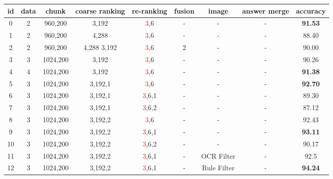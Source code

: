 \documentclass[11pt]{article}
\def\retrievaltextcircled#1{\large{\textcircled{\small{\color{blue}#1}}}\normalsize}
\def\reranktextcircled#1{\large{\textcircled{\small{\textcolor{red}{#1}}}}\normalsize}
\def\datatextcircled#1{\large{\textcircled{\small{#1}}}\normalsize}
\def\fusiontextcircled#1{\large{\textcircled{\small{\color{green}#1}}}\normalsize}
\def\doctextcircled#1{\large{\textcircled{\small{\color{purple}#1}}}\normalsize}
\begin{document}
\begin{table}[ht]
\centering
\begin{tabular}{ccccccccc}
\toprule
\textbf{id} & \textbf{data} & \textbf{chunk} & \textbf{coarse ranking} & \textbf{re-ranking} & \textbf{fusion} & \textbf{image} & \textbf{answer merge} & \textbf{accuracy} \\
\midrule
0 & \datatextcircled{2} & 960,200 & \retrievaltextcircled{3},192 &\reranktextcircled{3},6 & -& - & - & \textbf{91.53} \\
1 & \datatextcircled{2} & 960,200 & \retrievaltextcircled{4},288 &\reranktextcircled{3},6 & -& - & - & 88.40 \\
2 & \datatextcircled{2} & 960,200 & \retrievaltextcircled{4},288 \retrievaltextcircled{3},192 &\reranktextcircled{3},6 & \fusiontextcircled{2} & -& -  & 90.00 \\
3 & \datatextcircled{3} & 1024,200 & \retrievaltextcircled{3},192 &\reranktextcircled{3},6 & - & -& -  & 90.26 \\
4 & \datatextcircled{4} & 1024,200 & \retrievaltextcircled{3},192 &\reranktextcircled{3},6 & - & -& - & \textbf{91.38} \\
\midrule
5 & \datatextcircled{3} & 1024,200 & \retrievaltextcircled{3},192,\doctextcircled{1} &\reranktextcircled{3},6 & - & -& -  &\textbf{92.70} \\
6 & \datatextcircled{3} & 1024,200 & \retrievaltextcircled{3},192,\doctextcircled{1} &\reranktextcircled{3},6,\doctextcircled{1} & -& -& -  & 89.30 \\
7 & \datatextcircled{3} & 1024,200 & \retrievaltextcircled{3},192,\doctextcircled{1} &\reranktextcircled{3},6,\doctextcircled{2} & -& -& -  & 87.12 \\
8 & \datatextcircled{3} & 1024,200 & \retrievaltextcircled{3},192,\doctextcircled{2} &\reranktextcircled{3},6 & -& -& -  & 92.43 \\
9 & \datatextcircled{3} & 1024,200 & \retrievaltextcircled{3},192,\doctextcircled{2} &\reranktextcircled{3},6,\doctextcircled{1} & -& -& -  & \textbf{93.11} \\
10 & \datatextcircled{3} & 1024,200 & \retrievaltextcircled{3},192,\doctextcircled{2} &\reranktextcircled{3},6,\doctextcircled{2} & -& -& -  & 90.17 \\
\midrule
11 & \datatextcircled{3} & 1024,200 & \retrievaltextcircled{3},192,\doctextcircled{2} &\reranktextcircled{3},6,\doctextcircled{1} & -& OCR Filter & -  & 92.5 \\
12 & \datatextcircled{3} & 1024,200 & \retrievaltextcircled{3},192,\doctextcircled{2} &\reranktextcircled{3},6,\doctextcircled{1} & -& Rule Filter & -  & \textbf{94.24} \\

\end{tabular}
\end{table}
\end{document}
